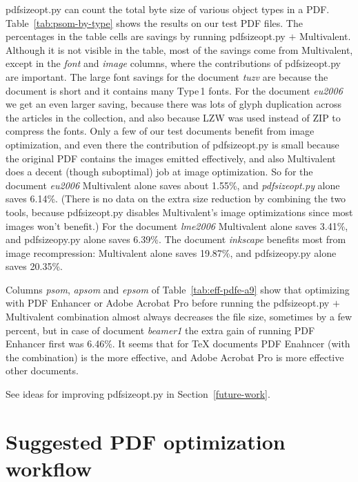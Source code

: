 \documentclass{ltugproc}
\def\cmd{\textsf}
\begin{document}
\cmd{pdfsizeopt.py} can count the total byte size of
various object types in a PDF. Table~\ref{tab:psom-by-type} shows the
results on our test PDF files. The percentages in the table cells are
savings by running \cmd{pdfsizeopt.py} $+$ Multivalent. Although it is not
visible in the table, most of the savings come from Multivalent, except in
the \emph{font} and \emph{image} columns, where the contributions of
\cmd{pdfsizeopt.py} are important. The large font savings for the document
\emph{tuzv} are because the document is short and it contains many Type\,1
fonts. For the document \emph{eu2006} we get an even larger saving, because
there was lots of glyph duplication across the articles in the collection,
and also because LZW was used instead of ZIP to compress the fonts. Only a
few of our test documents benefit from image optimization, and even there the
contribution of \cmd{pdfsizeopt.py} is small because the original
PDF contains the images emitted effectively, and also Multivalent does a
decent (though suboptimal) job at image optimization. So for the document
\emph{eu2006} Multivalent alone saves about 1.55\%, and \emph{pdfsizeopt.py}
alone saves 6.14\%. (There is no data on the
extra size reduction by combining the two
tools, because \cmd{pdfsizeopt.py} disables Multivalent's image
optimizations since most images won't benefit.)
For the document \emph{lme2006} Multivalent alone saves
3.41\%, and \cmd{pdfsizeopy.py} alone saves 6.39\%. The document
\emph{inkscape} benefits most from image recompression: Multivalent alone
saves 19.87\%, and \cmd{pdfsizeopy.py} alone saves 20.35\%.

Columns \emph{psom}, \emph{apsom} and \emph{epsom} of
Table~\ref{tab:eff-pdfe-a9} show that optimizing with PDF Enhancer or Adobe
Acrobat Pro before running the \cmd{pdfsizeopt.py} $+$ Multivalent
combination almost always decreases the file size, sometimes by a few
percent, but in case of document \emph{beamer1} the extra gain of running
PDF Enhancer first was 6.46\%. It seems that for \TeX{} documents
PDF Enahncer (with the combination) is the more effective, and Adobe Acrobat
Pro is more effective other documents.

See ideas for improving \cmd{pdfsizeopt.py} in Section~\ref{future-work}.



\section{Suggested PDF optimization workflow}\label{workflow}
\end{document}
